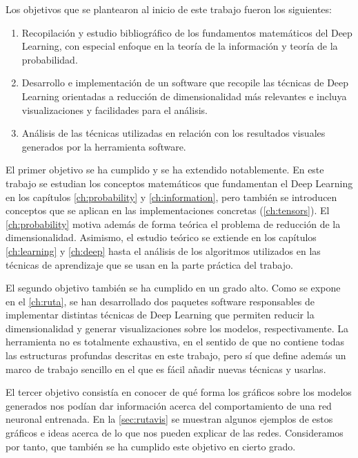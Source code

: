 
Los objetivos que se plantearon al inicio de este trabajo fueron los siguientes:
\begin{enumerate}
\item
  Recopilación y estudio bibliográfico de los fundamentos matemáticos
  del Deep Learning, con especial enfoque en la teoría de la información
  y teoría de la probabilidad.
\item
  Desarrollo e implementación de un software que recopile las
  técnicas de Deep Learning orientadas a reducción de dimensionalidad
  más relevantes e incluya visualizaciones y facilidades para el
  análisis.
\item
  Análisis de las técnicas utilizadas en relación con los
  resultados visuales generados por la herramienta software.
\end{enumerate}

El primer objetivo se ha cumplido y se ha extendido notablemente. En este trabajo se estudian los conceptos matemáticos que fundamentan el Deep Learning en los capítulos \ref{ch:probability} y \ref{ch:information}, pero también se introducen conceptos que se aplican en las implementaciones concretas (\autoref{ch:tensors}). El \autoref{ch:probability} motiva además de forma teórica el problema de reducción de la dimensionalidad. Asimismo, el estudio teórico se extiende en los capítulos \ref{ch:learning} y \ref{ch:deep} hasta el análisis de los algoritmos utilizados en las técnicas de aprendizaje que se usan en la parte práctica del trabajo.

El segundo objetivo también se ha cumplido en un grado alto. Como se expone en el \autoref{ch:ruta}, se han desarrollado dos paquetes software responsables de implementar distintas técnicas de Deep Learning que permiten reducir la dimensionalidad y generar visualizaciones sobre los modelos, respectivamente. La herramienta no es totalmente exhaustiva, en el sentido de que no contiene todas las estructuras profundas descritas en este trabajo, pero sí que define además un marco de trabajo sencillo en el que es fácil añadir nuevas técnicas y usarlas.

El tercer objetivo consistía en conocer de qué forma los gráficos sobre los modelos generados nos podían dar información acerca del comportamiento de una red neuronal entrenada. En la \autoref{sec:rutavis} se muestran algunos ejemplos de estos gráficos e ideas acerca de lo que nos pueden explicar de las redes. Consideramos por tanto, que también se ha cumplido este objetivo en cierto grado.

